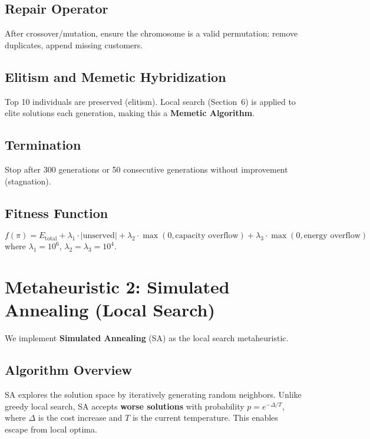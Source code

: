 \documentclass[12pt,a4paper]{article}
\begin{document}
\subsection{Repair Operator}
After crossover/mutation, ensure the chromosome is a valid permutation: remove duplicates, append missing customers.

\subsection{Elitism and Memetic Hybridization}
Top 10 individuals are preserved (elitism). Local search (Section~6) is applied to elite solutions each generation, making this a \textbf{Memetic Algorithm}.

\subsection{Termination}
Stop after 300 generations or 50 consecutive generations without improvement (stagnation).

\subsection{Fitness Function}
\begin{equation}
f(\pi) = E_{\text{total}} + \lambda_1\cdot|\text{unserved}| + \lambda_2\cdot\max(0, \text{capacity overflow}) + \lambda_3\cdot\max(0, \text{energy overflow})
\end{equation}
where $\lambda_1=10^6$, $\lambda_2=\lambda_3=10^4$.

\section{Metaheuristic 2: Simulated Annealing (Local Search)}
We implement \textbf{Simulated Annealing} (SA) as the local search metaheuristic.

\subsection{Algorithm Overview}
SA explores the solution space by iteratively generating random neighbors. Unlike greedy local search, SA accepts \textbf{worse solutions} with probability $p = e^{-\Delta / T}$, where $\Delta$ is the cost increase and $T$ is the current temperature. This enables escape from local optima.
\end{document}
